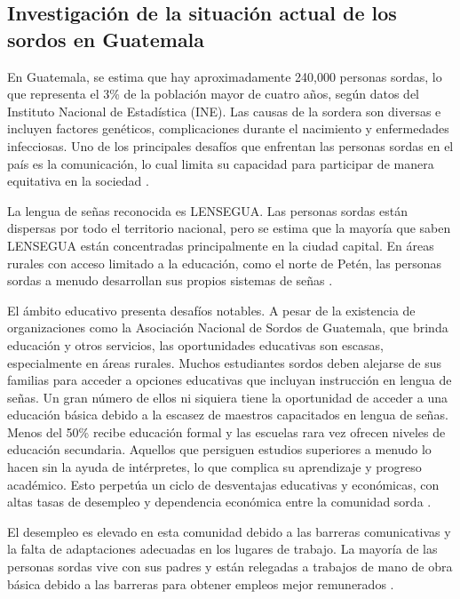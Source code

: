 
\subsection{Investigación de la situación actual de los sordos en Guatemala}

En Guatemala, se estima que hay aproximadamente 240,000 personas sordas, lo que representa el 3\% de la población mayor de cuatro años, según datos del Instituto Nacional de Estadística (INE). Las causas de la sordera son diversas e incluyen factores genéticos, complicaciones durante el nacimiento y enfermedades infecciosas. Uno de los principales desafíos que enfrentan las personas sordas en el país es la comunicación, lo cual limita su capacidad para participar de manera equitativa en la sociedad \cite{CongresoGuatemala} \cite{GobiernoGuatemala2022}.

La lengua de señas reconocida es LENSEGUA. Las personas sordas están dispersas por todo el territorio nacional, pero se estima que la mayoría que saben LENSEGUA están concentradas principalmente en la ciudad capital. En áreas rurales con acceso limitado a la educación, como el norte de Petén, las personas sordas a menudo desarrollan sus propios sistemas de señas \cite{JoshuaProject}. 

El ámbito educativo presenta desafíos notables. A pesar de la existencia de organizaciones como la Asociación Nacional de Sordos de Guatemala, que brinda educación y otros servicios, las oportunidades educativas son escasas, especialmente en áreas rurales. Muchos estudiantes sordos deben alejarse de sus familias para acceder a opciones educativas que incluyan instrucción en lengua de señas. Un gran número de ellos ni siquiera tiene la oportunidad de acceder a una educación básica debido a la escasez de maestros capacitados en lengua de señas. Menos del 50\% recibe educación formal y las escuelas rara vez ofrecen niveles de educación secundaria. Aquellos que persiguen estudios superiores a menudo lo hacen sin la ayuda de intérpretes, lo que complica su aprendizaje y progreso académico. Esto perpetúa un ciclo de desventajas educativas y económicas, con altas tasas de desempleo y dependencia económica entre la comunidad sorda \cite{EndangeredLanguages}.

El desempleo es elevado en esta comunidad debido a las barreras comunicativas y la falta de adaptaciones adecuadas en los lugares de trabajo. La mayoría de las personas sordas vive con sus padres y están relegadas a trabajos de mano de obra básica debido a las barreras para obtener empleos mejor remunerados \cite{EndangeredLanguages}.


